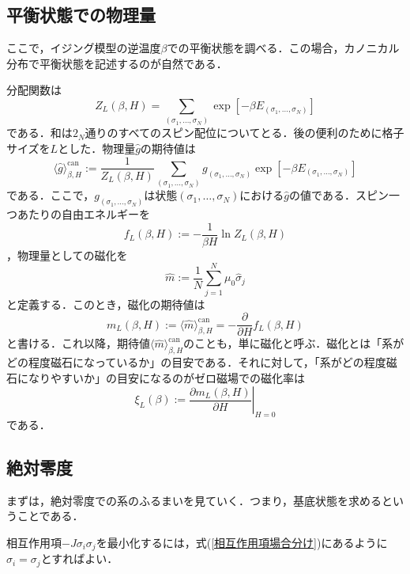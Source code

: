 \documentclass[a4paper,11pt]{jsreport}
\begin{document}
\subsection{平衡状態での物理量}
ここで，イジング模型の逆温度$\beta$での平衡状態を調べる．この場合，カノニカル分布で平衡状態を記述するのが自然である．\par
分配関数は
\begin{equation}
  Z_L(\beta, H) = \sum_{(\sigma_1,\dots,\sigma_N)} \exp{[-\beta E_{(\sigma_1,\dots,\sigma_N)}]}
\end{equation}
である．和は$2_N$通りのすべてのスピン配位についてとる．後の便利のために格子サイズを$L$とした．物理量$\hat{g}$の期待値は
\begin{equation}
  \langle \hat{g} \rangle_{\beta, H}^{\text{can}}
  := \frac{1}{Z_L(\beta, H)}  \sum_{(\sigma_1,\dots,\sigma_N)} g_{(\sigma_1,\dots,\sigma_N)} \exp{[-\beta E_{(\sigma_1,\dots,\sigma_N)}]}
\end{equation}
である．ここで，$g_{(\sigma_1,\dots,\sigma_N)}$は状態$(\sigma_1,\dots,\sigma_N)$における$\hat{g}$の値である．スピン一つあたりの自由エネルギーを
\begin{equation}
  f_L(\beta, H) := -\frac{1}{\beta H} \ln{Z_L(\beta, H)}
\end{equation}
，物理量としての磁化を
\begin{equation}
  \hat{m} := \frac{1}{N} \sum_{j=1}^{N} \mu_0 \hat{\sigma}_j
\end{equation}
と定義する．このとき，磁化の期待値は
\begin{equation}
  m_L(\beta, H) := \langle \hat{m} \rangle_{\beta, H}^{\text{can}} = -\frac{\partial}{\partial H} f_L(\beta, H)
\end{equation}
と書ける．これ以降，期待値$\langle \hat{m} \rangle_{\beta, H}^{\text{can}}$のことも，単に磁化と呼ぶ．磁化とは「系がどの程度磁石になっているか」の目安である．それに対して，「系がどの程度磁石になりやすいか」の目安になるのがゼロ磁場での磁化率は
\begin{equation}
  \xi_L(\beta) := \left.\frac{\partial m_L(\beta, H)}{\partial H}\right|_{H=0}
\end{equation}
である．
\subsection{絶対零度}
まずは，絶対零度での系のふるまいを見ていく．つまり，基底状態を求めるということである．\par
相互作用項$-J\sigma_i \sigma_j$を最小化するには，式(\ref{相互作用項場合分け})にあるように$\sigma_i = \sigma_j$とすればよい．
\end{document}
